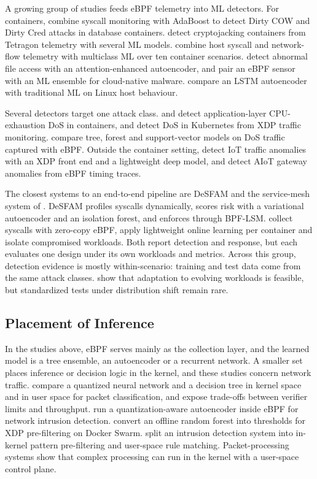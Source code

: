 A growing group of studies feeds eBPF telemetry into ML detectors. For containers, \textcite{P016} combine syscall monitoring with AdaBoost to detect Dirty COW and Dirty Cred attacks in database containers. \textcite{P006} detect cryptojacking containers from Tetragon telemetry with several ML models. \textcite{P018} combine host syscall and network-flow telemetry with multiclass ML over ten container scenarios. \textcite{P017} detect abnormal file access with an attention-enhanced autoencoder, and \textcite{P038} pair an eBPF sensor with an ML ensemble for cloud-native malware. \textcite{P015} compare an LSTM autoencoder with traditional ML on Linux host behaviour.

Several detectors target one attack class. \textcite{P003} and \textcite{P024} detect application-layer CPU-exhaustion DoS in containers, and \textcite{P011} detect DoS in Kubernetes from XDP traffic monitoring. \textcite{P013} compare tree, forest and support-vector models on DoS traffic captured with eBPF. Outside the container setting, \textcite{P002} detect IoT traffic anomalies with an XDP front end and a lightweight deep model, and \textcite{P004} detect AIoT gateway anomalies from eBPF timing traces.

The closest systems to an end-to-end pipeline are DeSFAM \parencite{P005} and the service-mesh system of \textcite{P034}. DeSFAM profiles syscalls dynamically, scores risk with a variational autoencoder and an isolation forest, and enforces through BPF-LSM. \textcite{P034} collect syscalls with zero-copy eBPF, apply lightweight online learning per container and isolate compromised workloads. Both report detection and response, but each evaluates one design under its own workloads and metrics. Across this group, detection evidence is mostly within-scenario: training and test data come from the same attack classes. \textcite{P034} show that adaptation to evolving workloads is feasible, but standardized tests under distribution shift remain rare.

\subsection{Placement of Inference}

In the studies above, eBPF serves mainly as the collection layer, and the learned model is a tree ensemble, an autoencoder or a recurrent network. A smaller set places inference or decision logic in the kernel, and these studies concern network traffic. \textcite{P012} compare a quantized neural network and a decision tree in kernel space and in user space for packet classification, and expose trade-offs between verifier limits and throughput. \textcite{P014} run a quantization-aware autoencoder inside eBPF for network intrusion detection. \textcite{P031} convert an offline random forest into thresholds for XDP pre-filtering on Docker Swarm. \textcite{R047} split an intrusion detection system into in-kernel pattern pre-filtering and user-space rule matching. Packet-processing systems \parencite{P035,P008} show that complex processing can run in the kernel with a user-space control plane.

